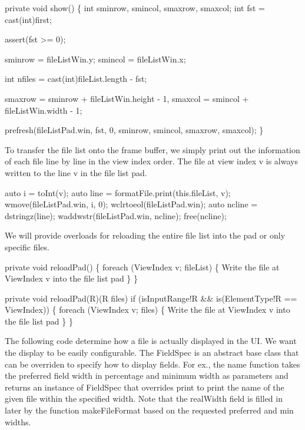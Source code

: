 \nwenddocs{}\endmoddef\nwstartdeflinemarkup\nwenddeflinemarkup
private void show() \{
  int sminrow, smincol, smaxrow, smaxcol;
  int fst = cast(int)first;

  assert(fst >= 0);

  sminrow = fileListWin.y;
  smincol = fileListWin.x;
  
  int nfiles = cast(int)fileList.length - fst;

  smaxrow = sminrow + fileListWin.height - 1,
  smaxcol = smincol + fileListWin.width  - 1;
  
  prefresh(fileListPad.win,
           fst,
           0,
           sminrow,
           smincol,
           smaxrow,
           smaxcol);
\}

\nwendcode{}To transfer the file list onto the frame buffer, we simply print out
the information of each file line by line in the view index order. The
file at view index {\Tt{}v\nwendquote} is always written to the line {\Tt{}v\nwendquote} in the
file list pad.

\nwenddocs{}\endmoddef\nwstartdeflinemarkup\nwenddeflinemarkup
auto i = toInt(v);
auto line = formatFile.print(this.fileList, v);
wmove(fileListPad.win, i, 0);
wclrtoeol(fileListPad.win);
auto ncline = dstringz(line);
waddwstr(fileListPad.win, ncline);
free(ncline);

\nwendcode{}We will provide overloads for reloading the entire file list into
the pad or only specific files.

\nwenddocs{}\endmoddef\nwstartdeflinemarkup\nwenddeflinemarkup
private void reloadPad()
\{
  foreach (ViewIndex v; fileList) \{
    \LA{}Write the file at ViewIndex v into the file list pad\RA{}
  \}
\}

private void reloadPad(R)(R files)
  if (isInputRange!R && is(ElementType!R == ViewIndex))
\{
  foreach (ViewIndex v; files) \{
    \LA{}Write the file at ViewIndex v into the file list pad\RA{}
  \}
\}

\nwendcode{}The following code determine how a file is actually displayed in the
UI. We want the display to be easily configurable. The {\Tt{}FieldSpec\nwendquote}
is an abstract base class that can be overriden to specify how to
display fields. For ex., the {\Tt{}name\nwendquote} function takes the preferred
field width in percentage and minimum width as parameters and returns
an instance of {\Tt{}FieldSpec\nwendquote} that overrides {\Tt{}print\nwendquote} to print the
name of the given file within the specified width. Note that the
{\Tt{}realWidth\nwendquote} field is filled in later by the function
{\Tt{}makeFileFormat\nwendquote} based on the requested preferred and min widths.

